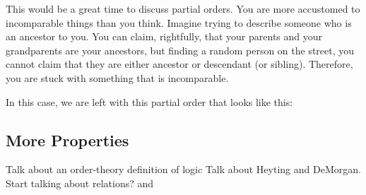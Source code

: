 This would be a great time to discuss partial orders. You are more accustomed to incomparable things than you think. Imagine trying to describe someone who is an ancestor to you. You can claim, rightfully, that your parents and your grandparents are your ancestors, but finding a random person on the street, you cannot claim that they are either ancestor or descendant (or sibling). Therefore, you are stuck with something that is incomparable.

In this case, we are left with this partial order that looks like this:




\subsection{More Properties}



Talk about an order-theory definition of logic
Talk about Heyting and DeMorgan.
Start talking about relations? and 